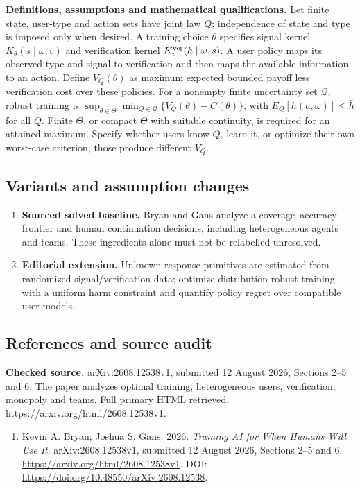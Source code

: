 \documentclass[11pt,a4paper]{article}
\begin{document}
\textbf{Definitions, assumptions and mathematical qualifications.} Let finite state, user-type and action sets have joint law \(Q\); independence of state and type is imposed only when desired. A training choice \(\theta\) specifies signal kernel \(K_\theta(s\mid\omega,v)\) and verification kernel \(K_v^{\rm ver}(h\mid\omega,s)\). A user policy maps its observed type and signal to verification and then maps the available information to an action. Define \(V_Q(\theta)\) as maximum expected bounded payoff less verification cost over these policies. For a nonempty finite uncertainty set \(\mathcal Q\), robust training is \(\sup_{\theta\in\Theta}\min_{Q\in\mathcal Q}\{V_Q(\theta)-C(\theta)\}\), with \(E_Q[h(a,\omega)]\leq\bar h\) for all \(Q\). Finite \(\Theta\), or compact \(\Theta\) with suitable continuity, is required for an attained maximum. Specify whether users know \(Q\), learn it, or optimize their own worst-case criterion; those produce different \(V_Q\).
\subsection*{Variants and assumption changes}
\begin{enumerate}
\item \textbf{Sourced solved baseline.} Bryan and Gans analyze a coverage--accuracy frontier and human continuation decisions, including heterogeneous agents and teams. These ingredients alone must not be relabelled unresolved.
\item \textbf{Editorial extension.} Unknown response primitives are estimated from randomized signal/verification data; optimize distribution-robust training with a uniform harm constraint and quantify policy regret over compatible user models.
\end{enumerate}
\subsection*{References and source audit}
\textbf{Checked source.} arXiv:2608.12538v1, submitted 12 August 2026, Sections 2--5 and 6. The paper analyzes optimal training, heterogeneous users, verification, monopoly and teams. Full primary HTML retrieved. \url{https://arxiv.org/html/2608.12538v1}.
\begin{enumerate}\raggedright
\item\hypertarget{definitions:source:30007700:1}{} Kevin A. Bryan; Joshua S. Gans. 2026. \emph{Training AI for When Humans Will Use It}. arXiv:2608.12538v1, submitted 12 August 2026, Sections 2--5 and 6.
\url{https://arxiv.org/html/2608.12538v1}.
DOI: \url{https://doi.org/10.48550/arXiv.2608.12538}.
\end{enumerate}
\end{document}
